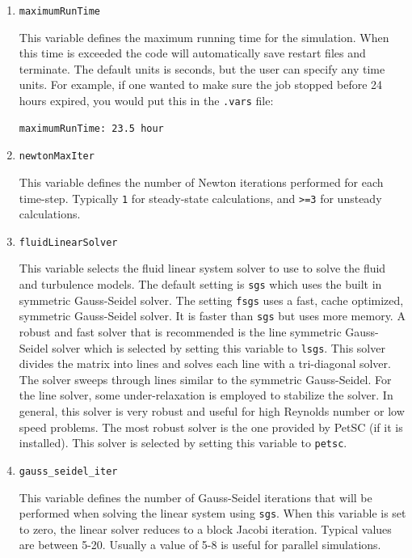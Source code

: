\documentclass{article}
\begin{document}
\begin{enumerate}
\item {\tt maximumRunTime}

  This variable defines the maximum running time for the
  simulation.  When this time is exceeded the code will automatically
  save restart files and terminate.  The default units
  is seconds, but the user can specify any time units.  For
  example, if one wanted to make sure the job stopped before 24 hours
  expired, you would put this in the {\tt .vars} file:
\begin{verbatim}
maximumRunTime: 23.5 hour
\end{verbatim}

\item {\tt newtonMaxIter}
  
  This variable defines the number of Newton iterations performed
  for each time-step.  Typically {\tt 1} for steady-state calculations,
  and {\tt >=3} for unsteady calculations.

\item {\tt fluidLinearSolver }

  This variable selects the fluid linear system solver to use to solve
  the fluid and turbulence models.  The default setting is {\tt sgs}
  which uses the built in symmetric Gauss-Seidel solver.  The setting
  {\tt fsgs} uses a fast, cache optimized, symmetric Gauss-Seidel
  solver.  It is faster than {\tt sgs} but uses more memory.  A robust
  and fast solver that is recommended is the line symmetric
  Gauss-Seidel solver which is selected by setting this variable to
  {\tt lsgs}.  This solver divides the matrix into lines and solves
  each line with a tri-diagonal solver.  The solver sweeps through
  lines similar to the symmetric Gauss-Seidel.  For the line solver,
  some under-relaxation is employed to stabilize the solver.  In general,
  this solver is very robust and useful for high Reynolds number or
  low speed problems.  The most robust solver is the one provided by
  PetSC (if it is installed).  This solver is selected by setting this
  variable to {\tt petsc}.

\item {\tt gauss\_seidel\_iter}

  This variable defines the number of Gauss-Seidel iterations that
  will be performed when solving the linear system using {\tt sgs}.
  When this variable is set to zero, the linear solver reduces to a
  block Jacobi iteration.  Typical values are between 5-20.  Usually a
  value of 5-8 is useful for parallel simulations.


\end{enumerate}
\end{document}
